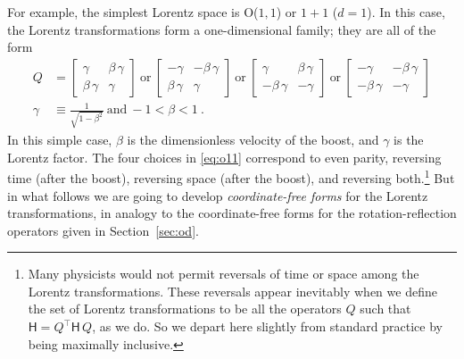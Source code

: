 \documentclass{article}
\newcommand{\metric}{\mathsf{H}}
\newcommand{\plus}{\!+\!} %
\newcommand{\secref}[1]{Section~\ref{#1}}
\begin{document}
For example, the simplest Lorentz space is O($1,1$) or $1\plus1$ ($d=1$).
In this case, the Lorentz transformations form a one-dimensional family; they are all of the form
\begin{align}
    Q &= \begin{bmatrix}\gamma & \beta\,\gamma \\ \beta\,\gamma & \gamma\end{bmatrix} ~\mbox{or}~
    \begin{bmatrix}-\gamma & -\beta\,\gamma \\ \beta\,\gamma & \gamma\end{bmatrix} ~\mbox{or}~
    \begin{bmatrix}\gamma & \beta\,\gamma \\ -\beta\,\gamma & -\gamma\end{bmatrix}  ~\mbox{or}~
    \begin{bmatrix}-\gamma & -\beta\,\gamma \\ -\beta\,\gamma & -\gamma\end{bmatrix} \label{eq:o11}
    \\
    \gamma &\equiv \frac{1}{\sqrt{1 - \beta^2}} ~ \mbox{and} ~ -1 < \beta < 1 ~.\nonumber
\end{align}
In this simple case, $\beta$ is the dimensionless velocity of the boost, and $\gamma$ is the Lorentz factor.
The four choices in \eqref{eq:o11} correspond to even parity, reversing time (after the boost), reversing space (after the boost), and reversing both.\footnote{%
Many physicists would not permit reversals of time or space among the Lorentz transformations.
These reversals appear inevitably when we define the set of Lorentz transformations to be all the operators $Q$ such that $\metric=Q^\top\metric\,Q$, as we do.
So we depart here slightly from standard practice by being maximally inclusive.}
But in what follows we are going to develop \emph{coordinate-free forms} for the Lorentz transformations, in analogy to the coordinate-free forms for the rotation-reflection operators given in \secref{sec:od}.
\end{document}
